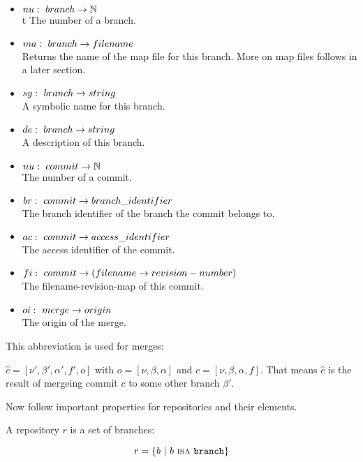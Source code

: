 \documentclass[fleqn, 10pt, a4paper]{article}
\begin{document}
\begin{itemize}
\item $\mathnormal{nu}:\ \mathnormal{branch} \rightarrow \mathbb{N}$ \\t
The number of a branch.
\item $\mathnormal{ma}:\ \mathnormal{branch} \rightarrow \mathnormal{filename}$ \\
Returns the name of the map file for this branch. More on map files follows in
a later section.
\item $\mathnormal{sy}:\ \mathnormal{branch} \rightarrow \mathnormal{string}$ \\
A symbolic name for this branch.
\item $\mathnormal{de}:\ \mathnormal{branch} \rightarrow \mathnormal{string}$ \\
A description of this branch.
\item $\mathnormal{nu}:\ \mathnormal{commit} \rightarrow \mathbb{N}$ \\
The number of a commit.
\item $\mathnormal{br}:\ \mathnormal{commit} \rightarrow \mathnormal{branch\_identifier}$ \\
The branch identifier of the branch the commit belongs to.
\item $\mathnormal{ac}:\ \mathnormal{commit} \rightarrow \mathnormal{access\_identifier}$ \\
The access identifier of the commit.
\item $\mathnormal{fi}:\ \mathnormal{commit} \rightarrow (\mathnormal{filename}
\rightarrow \mathnormal{revision-number})$ \\
The filename-revision-map of this commit.
\item $\mathnormal{oi}:\ \mathnormal{merge} \rightarrow \mathnormal{origin}$ \\
The origin of the merge.
\end{itemize}

This abbreviation is used for merges:

$\hat c = [\nu', \beta', \alpha', f', o]$ with $o=[\nu, \beta, \alpha]$ and
$c=[\nu, \beta, \alpha, f]$. That means $\hat c$ is the result of mergeing
commit $c$ to some other branch $\beta'$.

Now follow important properties for repositories and their elements.

A repository $r$ is a set of branches:

\begin{displaymath}
r = \{b \ |\ b\ \mbox{\textsc{isa}}\ \mathtt{branch}\}
\end{displaymath}
\end{document}
